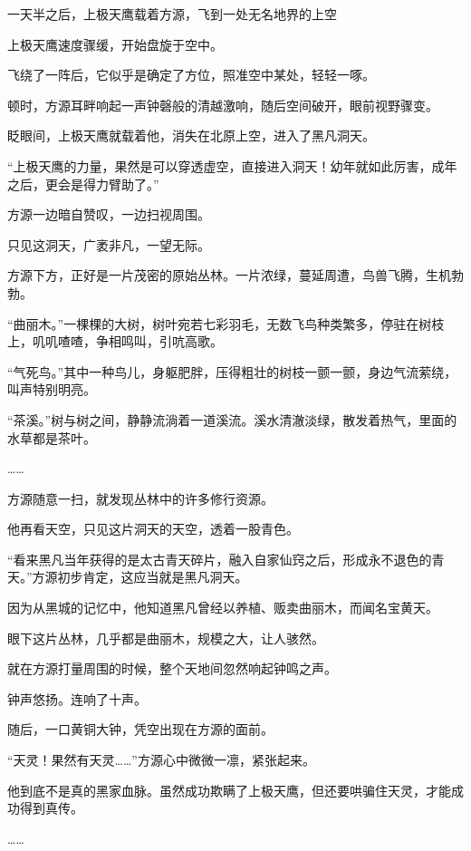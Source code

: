 
\begin{this_body}

一天半之后，上极天鹰载着方源，飞到一处无名地界的上空

上极天鹰速度骤缓，开始盘旋于空中。

飞绕了一阵后，它似乎是确定了方位，照准空中某处，轻轻一啄。

顿时，方源耳畔响起一声钟磬般的清越激响，随后空间破开，眼前视野骤变。

眨眼间，上极天鹰就载着他，消失在北原上空，进入了黑凡洞天。

“上极天鹰的力量，果然是可以穿透虚空，直接进入洞天！幼年就如此厉害，成年之后，更会是得力臂助了。”

方源一边暗自赞叹，一边扫视周围。

只见这洞天，广袤非凡，一望无际。

方源下方，正好是一片茂密的原始丛林。一片浓绿，蔓延周遭，鸟兽飞腾，生机勃勃。

“曲丽木。”一棵棵的大树，树叶宛若七彩羽毛，无数飞鸟种类繁多，停驻在树枝上，叽叽喳喳，争相鸣叫，引吭高歌。

“气死鸟。”其中一种鸟儿，身躯肥胖，压得粗壮的树枝一颤一颤，身边气流萦绕，叫声特别明亮。

“茶溪。”树与树之间，静静流淌着一道溪流。溪水清澈淡绿，散发着热气，里面的水草都是茶叶。

……

方源随意一扫，就发现丛林中的许多修行资源。

他再看天空，只见这片洞天的天空，透着一股青色。

“看来黑凡当年获得的是太古青天碎片，融入自家仙窍之后，形成永不退色的青天。”方源初步肯定，这应当就是黑凡洞天。

因为从黑城的记忆中，他知道黑凡曾经以养植、贩卖曲丽木，而闻名宝黄天。

眼下这片丛林，几乎都是曲丽木，规模之大，让人骇然。

就在方源打量周围的时候，整个天地间忽然响起钟鸣之声。

钟声悠扬。连响了十声。

随后，一口黄铜大钟，凭空出现在方源的面前。

“天灵！果然有天灵……”方源心中微微一凛，紧张起来。

他到底不是真的黑家血脉。虽然成功欺瞒了上极天鹰，但还要哄骗住天灵，才能成功得到真传。

……


\end{this_body}

